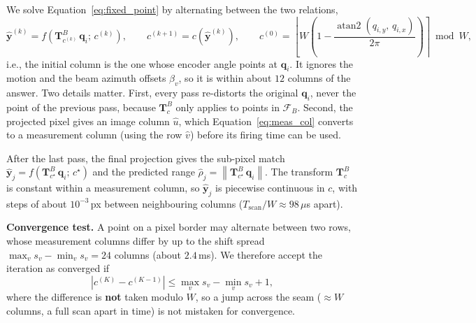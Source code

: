 We solve Equation~\eqref{eq:fixed_point} by alternating between the two relations,
\begin{equation}
    \label{eq:iteration}
    \hat{\mathbf{y}}^{(k)} = f\left(\mathbf{T}^{B}_{c^{(k)}}\,\mathbf{q}_i;\, c^{(k)}\right), \qquad
    c^{(k+1)} = c\left(\hat{\mathbf{y}}^{(k)}\right), \qquad
    c^{(0)} = \left\lfloor W\left(1 - \frac{\operatorname{atan2}(q_{i,y},\, q_{i,x})}{2\pi}\right)\right\rceil \bmod W,
\end{equation}
i.e., the initial column is the one whose encoder angle points at $\mathbf{q}_i$. It ignores the motion and the beam azimuth offsets $\beta_v$, so it is within about $12$ columns of the answer. Two details matter. First, every pass re-distorts the original $\mathbf{q}_i$, never the point of the previous pass, because $\mathbf{T}^{B}_{c}$ only applies to points in $\mathcal{F}_{B}$. Second, the projected pixel gives an image column $\hat{u}$, which Equation~\eqref{eq:meas_col} converts to a measurement column (using the row $\hat{v}$) before its firing time can be used.


After the last pass, the final projection gives the sub-pixel match $\hat{\mathbf{y}}_j = f\left(\mathbf{T}^{B}_{c^{\star}}\,\mathbf{q}_i;\, c^{\star}\right)$ and the predicted range $\hat{\rho}_j = \left\|\mathbf{T}^{B}_{c^{\star}}\,\mathbf{q}_i\right\|$. The transform $\mathbf{T}^{B}_{c}$ is constant within a measurement column, so $\hat{\mathbf{y}}_j$ is piecewise continuous in $c$, with steps of about $10^{-3}$\,px between neighbouring columns ($T_{\mathrm{scan}}/W \approx 98\,\mu$s apart).

\textbf{Convergence test.} A point on a pixel border may alternate between two rows, whose measurement columns differ by up to the shift spread $\max_v s_v - \min_v s_v = 24$ columns (about $2.4$\,ms). We therefore accept the iteration as converged if
\begin{equation}
    \left|c^{(K)} - c^{(K-1)}\right| \le \max_v s_v - \min_v s_v + 1,
\end{equation}
where the difference is \textbf{not} taken modulo $W$, so a jump across the seam ($\approx W$ columns, a full scan apart in time) is not mistaken for convergence.

